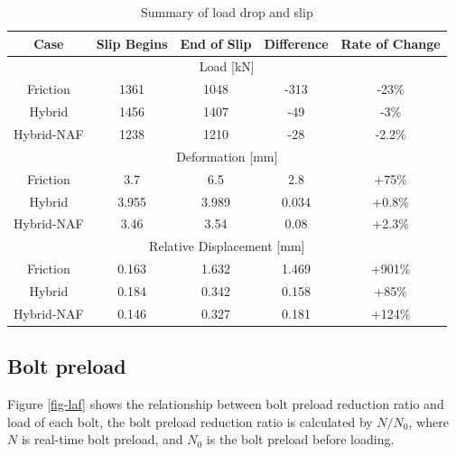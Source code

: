 \begin{table}[]
\centering
\caption{ Summary of load drop and slip }
\label{tab-sumld}
\begin{tabular}{@{}ccccc@{}}
\toprule
Case & Slip Begins & End of Slip & Difference & Rate of Change \\ \midrule
\multicolumn{5}{c}{Load {[}kN{]}} \\
Friction & 1361 & 1048 & -313 & -23\% \\
Hybrid & 1456 & 1407 & -49 & -3\% \\
Hybrid-NAF & 1238 & 1210 & -28 & -2.2\% \\
\multicolumn{5}{c}{Deformation {[}mm{]}} \\
Friction & 3.7 & 6.5 & 2.8 & +75\% \\
Hybrid & 3.955 & 3.989 & 0.034 & +0.8\% \\
Hybrid-NAF & 3.46 & 3.54 & 0.08 & +2.3\% \\
\multicolumn{5}{c}{Relative Displacement {[}mm{]}} \\
Friction & 0.163 & 1.632 & 1.469 & +901\% \\
Hybrid & 0.184 & 0.342 & 0.158 & +85\% \\ 
Hybrid-NAF & 0.146 & 0.327 & 0.181 & +124\% \\ 
\bottomrule
\end{tabular}
\end{table}




\subsection{Bolt preload}

Figure \ref{fig-laf} shows the relationship between bolt preload reduction ratio and load of each bolt, the bolt preload reduction ratio is calculated by $N/N_0$, where $N$ is real-time bolt preload, and $N_0$ is the bolt preload before loading. 

